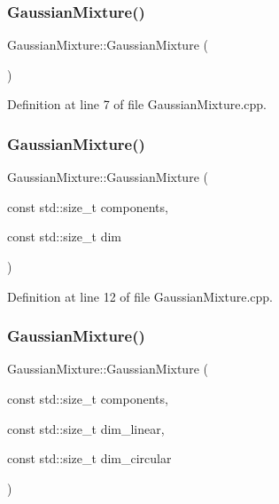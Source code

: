 \subsubsection{\texorpdfstring{Gaussian\+Mixture()}{GaussianMixture()}\hspace{0.1cm}{\footnotesize\ttfamily [1/3]}}
{\footnotesize\ttfamily Gaussian\+Mixture\+::\+Gaussian\+Mixture (\begin{DoxyParamCaption}{ }\end{DoxyParamCaption})}



Definition at line 7 of file Gaussian\+Mixture.\+cpp.

\mbox{\label{classbfl_1_1GaussianMixture_af2433812cdb02ca97c9cf6726683d31a}} 
\subsubsection{\texorpdfstring{Gaussian\+Mixture()}{GaussianMixture()}\hspace{0.1cm}{\footnotesize\ttfamily [2/3]}}
{\footnotesize\ttfamily Gaussian\+Mixture\+::\+Gaussian\+Mixture (\begin{DoxyParamCaption}\item[{const std\+::size\+\_\+t}]{components,  }\item[{const std\+::size\+\_\+t}]{dim }\end{DoxyParamCaption})}



Definition at line 12 of file Gaussian\+Mixture.\+cpp.

\mbox{\label{classbfl_1_1GaussianMixture_ab23a7e5d3646152dbd75cf50651ef896}} 
\subsubsection{\texorpdfstring{Gaussian\+Mixture()}{GaussianMixture()}\hspace{0.1cm}{\footnotesize\ttfamily [3/3]}}
{\footnotesize\ttfamily Gaussian\+Mixture\+::\+Gaussian\+Mixture (\begin{DoxyParamCaption}\item[{const std\+::size\+\_\+t}]{components,  }\item[{const std\+::size\+\_\+t}]{dim\+\_\+linear,  }\item[{const std\+::size\+\_\+t}]{dim\+\_\+circular }\end{DoxyParamCaption})}



